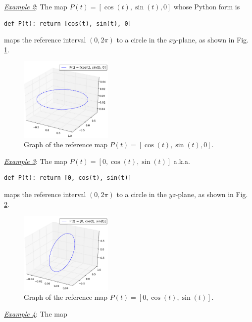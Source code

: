 \noindent
\underline{\em Example 2}: The map
$
P(t) = [\cos(t), \sin(t), 0]
$
whose Python form is\\

\begin{bbox}
\begin{verbatim}
def P(t): return [cos(t), sin(t), 0]
\end{verbatim}
\end{bbox}
\vspace{6mm}

\noindent
maps the reference interval $(0, 2\pi)$ to a circle in the 
$xy$-plane, as shown in Fig. \ref{fig:paramcu2}.

\begin{figure}[!ht]
\begin{center}
\includegraphics[width=0.4\textwidth]{img/paramcu2.png}
\end{center}
\vspace{-6mm}
\caption{Graph of the reference map $P(t) = [\cos(t), \sin(t), 0]$.}
\label{fig:paramcu2}
\end{figure}
\noindent
\noindent
\underline{\em Example 3}: The map
$
P(t) = [0, \cos(t), \sin(t)]
$
a.k.a.\\

\begin{bbox}
\begin{verbatim}
def P(t): return [0, cos(t), sin(t)]
\end{verbatim}
\end{bbox}
\vspace{6mm}

\noindent
maps the reference interval $(0, 2\pi)$ to a circle in the 
$yz$-plane, as shown in Fig. \ref{fig:paramcu3}.

\newpage
\begin{figure}[!ht]
\begin{center}
\includegraphics[width=0.4\textwidth]{img/paramcu3.png}
\end{center}
\vspace{-6mm}
\caption{Graph of the reference map $P(t) = [0, \cos(t), \sin(t)]$.}
\label{fig:paramcu3}
\end{figure}
\noindent
\underline{\em Example 4}: The map

